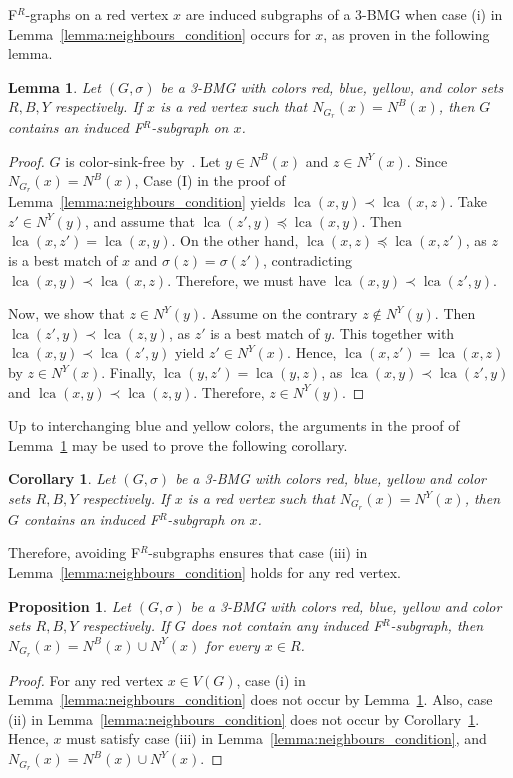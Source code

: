 \documentclass[final,3p,times]{elsarticle}
\newtheorem{proposition}[theorem]{Proposition}%
\newtheorem{lemma}[theorem]{Lemma}%
\newtheorem{corollary}[theorem]{Corollary}%
\DeclareMathOperator{\lca}{lca}
\begin{document}
F$^R$-graphs on a red vertex $x$ are induced subgraphs of a 3-BMG when case (i) in Lemma~\ref{lemma:neighbours_condition} occurs for $x$, as proven in the following lemma.
\begin{lemma}
\label{lemma:caseI-red_triangular}
Let $(G,\sigma)$ be a 3-BMG with colors red, blue, yellow, and color sets $R,B,Y$ respectively.  If $x$ is a red vertex such that $N_{G_r}(x)=N^B(x)$, then $G$ contains an induced F$^R$-subgraph on $x$.
\end{lemma}
\begin{proof}
$G$ is color-sink-free by~\cite[Proposition~2.3]{korchmaros2021quasi}. Let $y\in N^B(x)$ and $z\in N^Y(x)$. Since $N_{G_r}(x)=N^B(x)$, Case (I) in the proof of Lemma~\ref{lemma:neighbours_condition} yields $\lca(x,y)\prec \lca(x,z)$. Take $z'\in N^Y(y)$, and assume that $\lca(z',y)\preceq \lca(x,y)$. Then $\lca(x,z')=\lca(x,y)$. On the other hand, $\lca(x,z)\preceq \lca(x,z')$, as $z$ is a best match of $x$ and $\sigma(z)=\sigma(z')$, contradicting $\lca(x,y) \prec \lca(x,z)$. Therefore, we must have $\lca(x,y)\prec \lca(z',y)$.

Now, we show that $z\in N^Y(y)$. Assume on the contrary $z\notin N^Y(y)$. Then $\lca(z',y)\prec \lca(z,y)$, as $z'$ is a best match of $y$. This together with $\lca(x,y)\prec \lca(z',y)$ yield $z'\in N^Y(x)$. Hence, $\lca(x,z')=\lca(x,z)$ by $z\in N^Y(x)$. Finally, $\lca(y,z')=\lca(y,z)$, as $\lca(x,y)\prec \lca(z',y)$ and $\lca(x,y)\prec \lca(z,y)$. Therefore, $z\in N^Y(y)$.
\end{proof}

Up to interchanging blue and yellow colors, the arguments in the proof of Lemma~\ref{lemma:caseI-red_triangular} may be used to prove the following corollary.

\begin{corollary}
\label{cor:caseII-red_triangular}
Let $(G,\sigma)$ be a 3-BMG with colors red, blue, yellow and color sets $R,B,Y$ respectively. If $x$ is a red vertex such that $N_{G_r}(x)=N^Y(x)$, then $G$ contains an induced F$^R$-subgraph on $x$.
\end{corollary}

Therefore, avoiding F$^R$-subgraphs ensures that case (iii) in Lemma~\ref{lemma:neighbours_condition} holds for any red vertex.

\begin{proposition}
\label{prop:caseiii-suf_cond}
Let $(G,\sigma)$ be a 3-BMG with colors red, blue, yellow  and color sets $R,B,Y$ respectively. If $G$ does not contain any induced F$^R$-subgraph, then $N_{G_r}(x)=N^B(x)\cup N^Y(x)$ for every $x\in R$.
\end{proposition}
\begin{proof}
For any red vertex $x\in V(G)$, case (i) in Lemma~\ref{lemma:neighbours_condition} does not occur by Lemma~\ref{lemma:caseI-red_triangular}. Also, case (ii) in Lemma~\ref{lemma:neighbours_condition} does not occur by Corollary~\ref{cor:caseII-red_triangular}. Hence, $x$ must satisfy case (iii) in Lemma~\ref{lemma:neighbours_condition}, and $N_{G_r}(x)=N^B(x)\cup N^Y(x)$. 
\end{proof}
\end{document}
